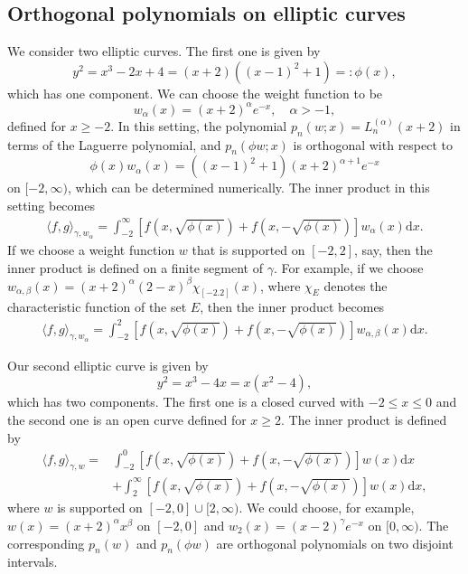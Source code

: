 \documentclass{amsart}
\theoremstyle{remark}
\def\la{{\langle}}
\def\ra{{\rangle}}
\def\d{\mathrm{d}}
\def\a{{\alpha}}
\def\b{{\beta}}
\def\g{{\gamma}}
\def\la{{\langle}}
\def\ra{{\rangle}}
\begin{document}
\subsection{Orthogonal polynomials on elliptic curves} We consider two elliptic curves. The first one is given by
$$
     y^2 = x^3 - 2 x + 4 = (x+2) \left((x -1)^2 +1\right) =: \phi(x),
$$
which has one component. We can choose the weight function to be 
$$
   w_\a(x) = (x+2)^\a e^{-x}, \quad \a > -1, 
$$
defined for $x \ge -2$. In this setting, the polynomial $p_n(w;x) = L_n^{(\a)}(x+2)$ in terms of the Laguerre 
polynomial, and $p_n(\phi w; x)$ is orthogonal with respect to 
$$
\phi(x) w_\a(x) = ((x -1)^2+1) (x+2)^{\a+1} e^{-x}
$$
on $[-2,\infty)$, which can be determined numerically. The inner product in this setting becomes
\begin{align*}
  \la f,g \ra_{\g,w_\a} = \int_{-2}^\infty \left[f \left(x, \sqrt{\phi(x)} \right) +  f \left(x, - \sqrt{\phi(x)} \right) \right] w_\a(x) \d x.
\end{align*}   
If we choose a weight function $w$ that is supported on $[-2, 2]$, say, then the inner product is defined on a finite
segment of $\g$. For example, if we choose $w_{\a,\b}(x) = (x+2)^\a (2-x)^\b \chi_{[-2.2]}(x)$, where $\chi_E$ denotes
the characteristic function of the set $E$, then the inner product becomes
\begin{align*}
  \la f,g \ra_{\g,w_\a} = \int_{-2}^2 \left[f \left(x, \sqrt{\phi(x)} \right) +  f \left(x, - \sqrt{\phi(x)} \right) \right] w_{\a,\b}(x) \d x.
\end{align*}   

Our second elliptic curve is given by 
$$
   y^2 = x^3 - 4 x = x (x^2-4),
$$
which has two components. The first one is a closed curved with $-2\le x \le 0$ and the second one is an open
curve defined for $x \ge 2$. The inner product is defined by 
\begin{align*}
  \la f,g\ra_{\g,w} =&  \int_{-2}^0 \left[f \left(x, \sqrt{\phi(x)} \right) +  f \left(x, - \sqrt{\phi(x)} \right) \right] w(x) \d x \\
        & +   \int_{2}^\infty \left[f \left(x, \sqrt{\phi(x)} \right) +  f \left(x, - \sqrt{\phi(x)} \right) \right] w(x) \d x,
\end{align*}
where $w$ is supported on $[-2,0]\cup [2, \infty)$. We could choose, for example, $w(x) = (x+2)^\a x^\b$ on $[-2,0]$
and $w_2(x) = (x-2)^\g e^{-x}$ on $[0,\infty)$. The corresponding $p_n(w)$ and $p_n(\phi w)$ are orthogonal 
polynomials on two disjoint intervals.  
\end{document}
